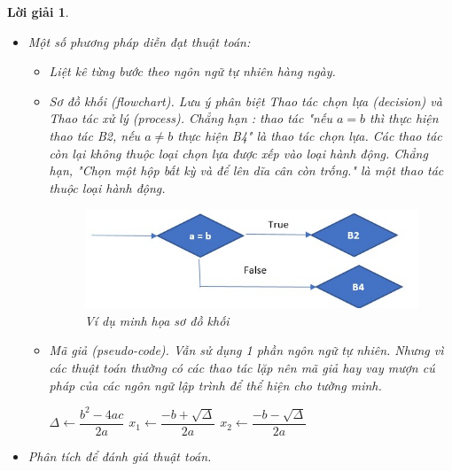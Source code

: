 \documentclass[14pt, a4paper]{article}
\theoremstyle{sltheorem}
\theoremstyle{soltheorem}
\newtheorem*{loigiai}{Lời giải}
\begin{document}
\begin{loigiai}
\begin{enumerate}[a)]
\begin{itemize}
                \item Một số phương pháp diễn đạt thuật toán:
                \begin{itemize}
                    \item Liệt kê từng bước theo ngôn ngữ tự nhiên hàng ngày. 
                    \item Sơ đồ khối (flowchart). Lưu ý phân biệt Thao tác chọn lựa (decision) và Thao tác xử lý (process). Chẳng hạn : thao tác "nếu $a=b$ thì thực hiện thao tác B2, nếu $a \neq b$ thực hiện B4" là thao tác chọn lựa. Các thao tác còn lại không thuộc loại chọn lựa được xếp vào loại hành động. Chẳng hạn, "Chọn một hộp bất kỳ và để lên dĩa cân còn trống." là một thao tác thuộc loại hành động.
                    \begin{figure}[h!]
                        \centering
                        \includegraphics[scale=0.8]{flowchart.jpg}
                        \caption{Ví dụ minh họa sơ đồ khối}
                    \end{figure}
                    \item Mã giả (pseudo-code). Vẫn sử dụng 1 phần ngôn ngữ tự nhiên. Nhưng vì các thuật toán thường có các thao tác lặp nên mã giả hay vay mượn cú pháp của các ngôn ngữ lập trình để thể hiện cho tường minh.
                    \begin{algorithm}
                        \DontPrintSemicolon
                        $\Delta \gets \dfrac{b^2 - 4ac}{2a}$\;
                         {
                            $x_1 \gets \dfrac{-b + \sqrt{\Delta}}{2a}$\;
                            $x_2 \gets \dfrac{-b - \sqrt{\Delta}}{2a}$\;
                            \;
                        } 
                        \caption{Mã giả thuật toán giải phương trình bậc 2}
                    \end{algorithm}  
                \end{itemize}
                \item Phân tích để đánh giá thuật toán.
                

\end{itemize}
\end{enumerate}
\end{loigiai}
\end{document}
